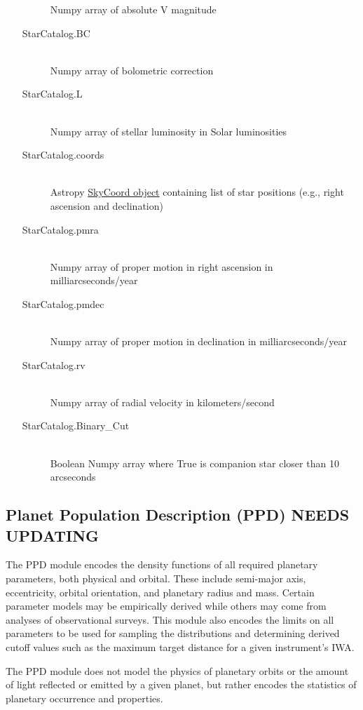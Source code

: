 \documentclass[cleanfoot]{asme2ej}
\begin{document}
\begin{itemize}
\begin{description}
        Numpy array of absolute V magnitude
        \item[StarCatalog.BC] \hfill \\
        Numpy array of bolometric correction
        \item[StarCatalog.L] \hfill \\
        Numpy array of stellar luminosity in Solar luminosities
        \item[StarCatalog.coords] \hfill \\
        Astropy \href{http://astropy.readthedocs.org/en/latest/api/astropy.coordinates.SkyCoord.html}{SkyCoord object} containing list of star positions (e.g., right ascension and declination)
        \item[StarCatalog.pmra] \hfill \\
        Numpy array of proper motion in right ascension in milliarcseconds/year
        \item[StarCatalog.pmdec] \hfill \\
        Numpy array of proper motion in declination in milliarcseconds/year
        \item[StarCatalog.rv] \hfill \\
        Numpy array of radial velocity in kilometers/second
        \item[StarCatalog.Binary\_Cut] \hfill \\
        Boolean Numpy array where True is companion star closer than 10 arcseconds
    \end{description}
\end{itemize}


\subsection{Planet Population Description (PPD) NEEDS UPDATING}
The PPD module encodes the density functions of all required planetary parameters, both physical and orbital. These include semi-major axis, eccentricity, orbital orientation, and planetary radius and mass. Certain parameter models may be empirically derived while others may come from analyses of observational surveys.  This module also encodes the limits on all parameters to be used for sampling the distributions and determining derived cutoff values such as the maximum target distance for a given instrument's IWA.

The PPD module does not model the physics of planetary orbits or the amount of light reflected or emitted by a given planet, but rather encodes the statistics of planetary occurrence and properties.  
\label{sec:planetpopulation}
\end{document}
